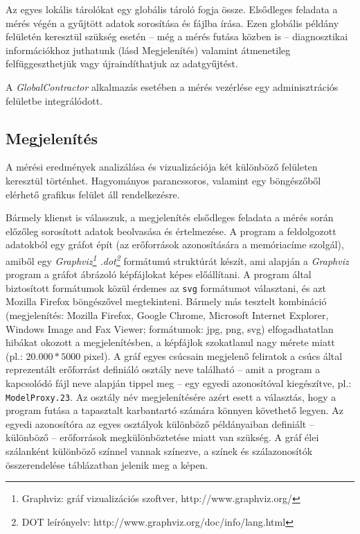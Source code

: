     Az egyes lokális tárolókat egy globális tároló fogja össze. Elsődleges feladata a mérés végén a gyűjtött adatok sorosítása és fájlba írása. Ezen globális példány felületén keresztül szükség esetén -- még a mérés futása közben is -- diagnosztikai információkhoz juthatunk (lásd Megjelenítés) valamint átmenetileg felfüggeszthetjük vagy újraindíthatjuk az adatgyűjtést.
    
    A \emph{GlobalContractor} alkalmazás esetében a mérés vezérlése egy adminisztrációs felületbe integrálódott.
    
    \subsection{Megjelenítés}
    A mérési eredmények analizálása és vizualizációja két különböző felületen keresztül történhet. Hagyományos parancssoros, valamint egy böngészőből elérhető grafikus felület áll rendelkezésre.
    
    Bármely klienst is válasszuk, a megjelenítés elsődleges feladata a mérés során előzőleg sorosított adatok beolvasása és értelmezése. A program a feldolgozott adatokból egy gráfot épít (az erőforrások azonosítására a memóriacíme szolgál), amiből egy \emph{Graphviz\footnote{Graphviz: gráf vizualizációs szoftver, http://www.graphviz.org/} .dot\footnote{DOT leírónyelv: http://www.graphviz.org/doc/info/lang.html}} formátumú struktúrát készít, ami alapján a \emph{Graphviz} program a gráfot ábrázoló képfájlokat képes előállítani. A program által biztosított formátumok közül érdemes az \texttt{svg} formátumot választani, és azt Mozilla Firefox böngészővel megtekinteni. Bármely más tesztelt kombináció (megjelenítés: Mozilla Firefox, Google Chrome, Microsoft Internet Explorer, Windows Image and Fax Viewer; formátumok: jpg, png, svg) elfogadhatatlan hibákat okozott a megjelenítésben, a képfájlok szokatlanul nagy mérete miatt (pl.: $20.000 * 5000$ pixel). A gráf egyes csúcsain megjelenő feliratok a csúcs által reprezentált erőforrást definiáló osztály neve található -- amit a program a kapcsolódó fájl neve alapján tippel meg -- egy egyedi azonosítóval kiegészítve, pl.: \texttt{ModelProxy.23}. Az osztály név megjelenítésére azért esett a választás, hogy a program futása a tapasztalt karbantartó számára könnyen követhető legyen. Az egyedi azonosítóra az egyes osztályok különböző példányaiban definiált -- különböző -- erőforrások megkülönböztetése miatt van szükség. A gráf élei szálanként különböző színnel vannak színezve, a színek és szálazonosítók összerendelése táblázatban jelenik meg a képen.
    
